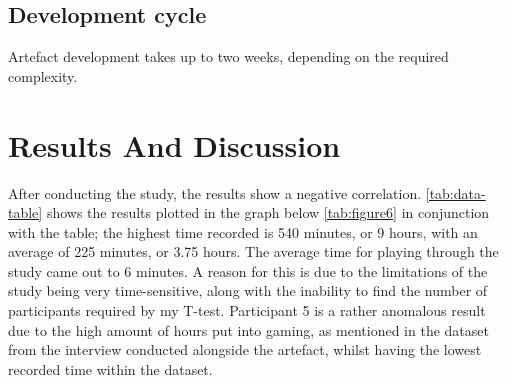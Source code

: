 \documentclass[conference]{IEEEtran}
\begin{document}
\subsection{Development cycle}
Artefact development takes up to two weeks, depending on the required complexity.

\section{Results And Discussion}
\begin{table}[H]
\centering
{}
\caption{Table 1 - The data collected from the experiment over two weeks.}
\label{tab:data-table}
\end{table}

After conducting the study, the results show a negative correlation. \ref{tab:data-table} shows the results plotted in the graph below \ref{tab:figure6} in conjunction with the table; the highest time recorded is 540 minutes, or 9 hours, with an average of 225
 minutes, or 3.75 hours. The average time for playing through the study came out to 6 minutes. A reason for this is due to the limitations of the study being very time-sensitive, along with the inability to find the number of participants required by my T-test. Participant 5 is a rather anomalous result due to the high amount of hours put into gaming, as mentioned in the dataset from the interview conducted alongside the artefact, whilst having the lowest recorded time within the dataset.
\end{document}
